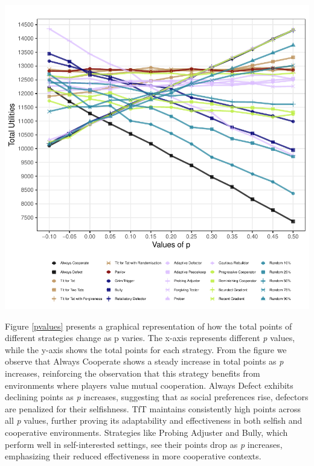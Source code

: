 \documentclass[11pt,preprint]{elsarticle}
\let\origfigure\figure
\let\endorigfigure\endfigure
\renewenvironment{figure}[1][2] {
    \expandafter\origfigure\expandafter[H]
} {
    \endorigfigure
}
\numberwithin{equation}{section}
\numberwithin{figure}{section}
\numberwithin{table}{section}
\begin{document}
\begin{figure}[H]

{\centering \includegraphics{Prisoners-Dilemma_files/figure-latex/unnamed-chunk-5-1} 

}

\caption{Strategies' Total Utilities for Different Strategies Accross p\label{pvalues}}\label{fig:unnamed-chunk-5}
\end{figure}

Figure \ref{pvalues} presents a graphical representation of how the
total points of different strategies change as p varies. The x-axis
represents different \emph{p} values, while the y-axis shows the total
points for each strategy. From the figure we observe that Always
Cooperate shows a steady increase in total points as \emph{p} increases,
reinforcing the observation that this strategy benefits from
environments where players value mutual cooperation. Always Defect
exhibits declining points as \emph{p} increases, suggesting that as
social preferences rise, defectors are penalized for their selfishness.
TfT maintains consistently high points across all \emph{p} values,
further proving its adaptability and effectiveness in both selfish and
cooperative environments. Strategies like Probing Adjuster and Bully,
which perform well in self-interested settings, see their points drop as
\emph{p} increases, emphasizing their reduced effectiveness in more
cooperative contexts.
\end{document}
